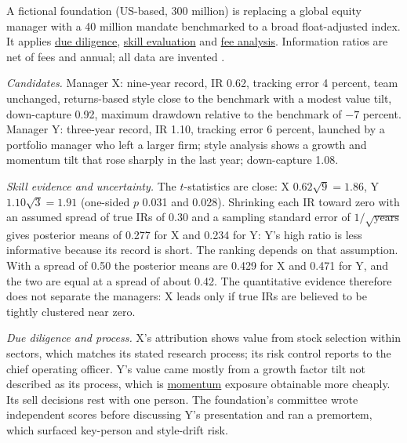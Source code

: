\begin{qfexample}\label{ex:manager-selection-case}
 A fictional foundation (US-based, 300 million) is replacing a global equity manager with a 40 million mandate benchmarked to a broad float-adjusted index. It applies \hyperref[meth:manager-due-diligence]{due diligence}, \hyperref[meth:manager-skill-evaluation]{skill evaluation} and \hyperref[meth:vehicle-contract-fee-analysis]{fee analysis}. Information ratios are net of fees and annual; all data are invented \citep[method from][chap.~12, pp.~776--781]{managing-investment-portfolios-2007}.

\emph{Candidates.} Manager X: nine-year record, IR 0.62, tracking error 4 percent, team unchanged, returns-based style close to the benchmark with a modest value tilt, down-capture 0.92, maximum drawdown relative to the benchmark of $-7$ percent. Manager Y: three-year record, IR 1.10, tracking error 6 percent, launched by a portfolio manager who left a larger firm; style analysis shows a growth and momentum tilt that rose sharply in the last year; down-capture 1.08.

 \emph{Skill evidence and uncertainty.} The $t$-statistics are close: X $0.62\sqrt9=1.86$, Y $1.10\sqrt3=1.91$ (one-sided $p$ 0.031 and 0.028). Shrinking each IR toward zero with an assumed spread of true IRs of 0.30 and a sampling standard error of $1/\sqrt{\text{years}}$ gives posterior means of 0.277 for X and 0.234 for Y: Y's high ratio is less informative because its record is short. The ranking depends on that assumption. With a spread of 0.50 the posterior means are 0.429 for X and 0.471 for Y, and the two are equal at a spread of about 0.42. The quantitative evidence therefore does not separate the managers: X leads only if true IRs are believed to be tightly clustered near zero.

\emph{Due diligence and process.} X's attribution shows value from stock selection within sectors, which matches its stated research process; its risk control reports to the chief operating officer. Y's value came mostly from a growth factor tilt not described as its process, which is \hyperref[mech:biases-market-anomalies]{momentum} exposure obtainable more cheaply. Its sell decisions rest with one person. The foundation's committee wrote independent scores before discussing Y's presentation and ran a premortem, which surfaced key-person and style-drift risk.


\end{qfexample}
